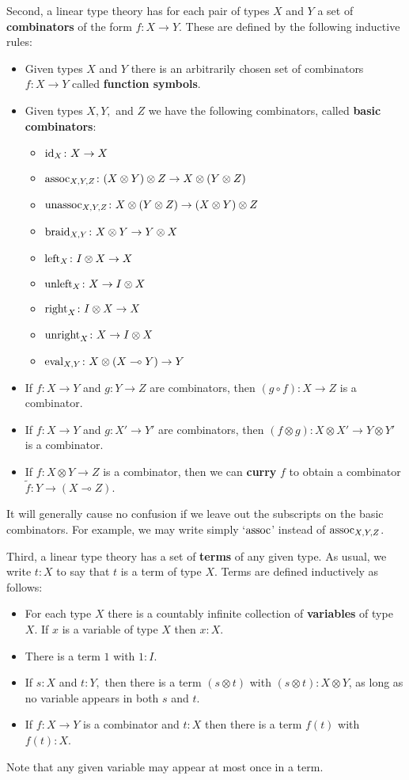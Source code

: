 \documentclass[12pt]{article}
\newcommand{\maps}{\colon}
\newcommand{\lhom}{\multimap}
\newcommand{\tensor}{\otimes}
\newcommand{\Id}{{\rm id}}
\newcommand{\eval}{{\rm eval}}
\newcommand{\assoc}{{\rm assoc}}
\newcommand{\unassoc}{{\rm unassoc}}
\newcommand{\braid}{{\rm braid}}
\newcommand{\Left}{{\rm left}}
\newcommand{\Right}{{\rm right}}
\newcommand{\unright}{{\rm unright}}
\newcommand{\unleft}{{\rm unleft}}
\begin{document}
Second, a linear type theory has for each pair of types $X$ and $Y$
a set of \textbf{combinators} of the form $f\maps X \to Y$.
These are defined by the following inductive rules:
\begin{itemize}
  \item Given types $X$ and $Y$ there is an arbitrarily chosen set
        of combinators $f\maps X\to Y$ called \textbf{function symbols}.
  \item Given types $X,Y,$ and $Z$ we have the following combinators,
        called \textbf{basic combinators}:
    \begin{itemize}
      \item $\Id_X \maps X \to X$
      \item $\assoc_{X,Y,Z}
      \maps (X\tensor Y)\tensor Z \to X \tensor (Y \tensor Z)$
      \item $\unassoc_{X,Y,Z}
      \maps X \tensor (Y \tensor Z) \to (X \tensor Y)\tensor Z$
      \item $\braid_{X,Y}\maps X \tensor Y \to Y \tensor X$ 
      \item $\Left_X \maps I \tensor X \to X$
      \item $\unleft_X \maps X \to I \tensor X$
      \item $\Right_X \maps I \tensor X \to X$
      \item $\unright_X \maps X \to I \tensor X$
      \item $\eval_{X,Y} \maps X \tensor (X \lhom Y) \to Y$      
    \end{itemize}
  \item If ${f\maps X \to Y}$ and ${g\maps Y \to Z}$ are combinators, then 
    $(g \circ f) \maps X \to Z$ is a combinator.
  \item If ${f\maps X \to Y}$ and ${g\maps X' \to Y'}$ are combinators, then
    ${(f \tensor g) \maps X \tensor X' \to Y \tensor Y'}$ is a combinator.
  \item If ${f\maps X \tensor Y \to Z}$ is a combinator, then we can
   {\bf curry} $f$ to obtain a combinator
    $\tilde{f} \maps Y \to (X \lhom Z)$.
\end{itemize}
It will generally cause no confusion if we leave out the subscripts on
the basic combinators.  For example, we may write simply `$\assoc$'
instead of $\assoc_{X,Y,Z}$.

Third, a linear type theory has a set of {\bf terms} of any given type.
As usual, we write $t:X$ to say that $t$ is a term of type $X$.  Terms
are defined inductively as follows:
\begin{itemize}
  \item  For each type $X$ there is a countably infinite collection of 
\textbf{variables} of type $X$.  If $x$ is a variable of type $X$ then 
$x:X$.
  \item There is a term $1$ with $1:I$.
  \item If $s:X$ and $t:Y,$ then there is a term $(s \tensor t)$ with
$(s \tensor t): X \tensor Y$, as long as no variable appears in both $s$
and $t$.
  \item If $f \maps X \to Y$ is a combinator and $t:X$ then there 
is a term $f(t)$ with $f(t):X$.
\end{itemize}
Note that any given variable may appear at most once in a term.
\end{document}
